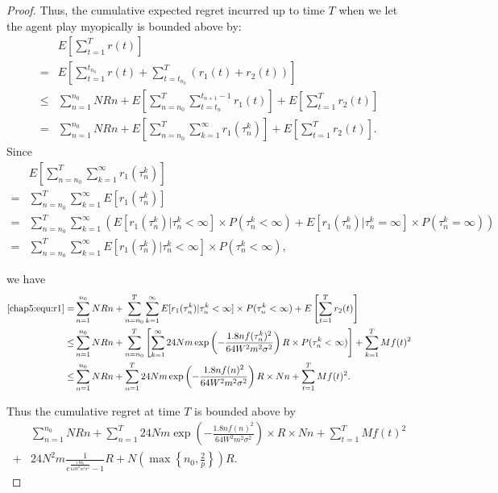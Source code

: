 \documentclass[twoside,11pt]{article}
\begin{document}
\begin{proof}
Thus, the cumulative expected regret incurred up to time $T$ when we let the agent play myopically is bounded above by:
\begin{align}
&E\left[\sum_{t=1}^{T}r(t)\right] \nonumber \\
=&E\left[\sum_{t=1}^{t_{n_{0}}} r(t) + \sum_{t=t_{n_{0}}}^{T}(r_1(t)+r_2(t))\right]  \nonumber \\
\leq & \sum_{n=1}^{n_{0}}NRn + E\left[\sum_{n=n_{0}}^{T}\sum_{t=t_{n}}^{t_{n+1}-1}r_1(t)\right]+ E\left[\sum_{t=1}^{T}r_2(t)\right] \nonumber \\
=& \sum_{n=1}^{n_{0}}NRn + E\left[\sum_{n=n_{0}}^{T}\sum_{k=1}^{\infty}r_1(\tau_{n}^{k})\right]+ E\left[\sum_{t=1}^{T}r_2(t)\right]. \label{chap5:equ:r1}
\end{align}
Since
\begin{align}
& E\left[\sum_{n=n_{0}}^{T}\sum_{k=1}^{\infty}r_1(\tau_{n}^{k})\right] \nonumber\\
= &  \sum_{n=n_{0}}^{T}\sum_{k=1}^{\infty}E[r_1(\tau_{n}^{k})] \nonumber \\
= &  \sum_{n=n_{0}}^{T}\sum_{k=1}^{\infty}(E[r_1(\tau_{n}^{k})|\tau_{n}^{k}<\infty]\times P(\tau_{n}^{k}<\infty)+E[r_1(\tau_{n}^{k})|\tau_{n}^{k}=\infty]\times P(\tau_{n}^{k}=\infty)) \nonumber \\
= & \sum_{n=n_{0}}^{T}\sum_{k=1}^{\infty}E[r_1(\tau_{n}^{k})|\tau_{n}^{k}<\infty]\times P(\tau_{n}^{k}<\infty), \nonumber
\end{align}

we have
\begin{align}
\eqref{chap5:equ:r1}= & \sum_{n=1}^{n_{0}}NRn + \sum_{n=n_{0}}^{T}\sum_{k=1}^{\infty}E[r_1(\tau_{n}^{k})|\tau_{n}^{k}<\infty]\times P(\tau_{n}^{k}<\infty) + E\left[\sum_{t=1}^{T}r_2(t)\right] \nonumber \\
\leq & \sum_{n=1}^{n_{0}}NRn + \sum_{n=n_{0}}^{T}\left[\sum_{k=1}^{\infty}24Nm\exp\left(-\frac{1.8n f(\tau_{n}^{k})^2}{64 W^2 m^2\sigma^2}\right) R\times P(\tau_{n}^{k}<\infty) \right]+ \sum_{k=1}^{T}Mf(t)^2 \nonumber \\
\leq & \sum_{n=1}^{n_{0}}NRn + \sum_{n=1}^{T} 24Nm\exp\left(-\frac{1.8n f(n)^2}{64 W^2 m^2\sigma^2}\right) R \times Nn+ \sum_{t=1}^{T}Mf(t)^2. \label{chap5:equ:regret}
\end{align}


 Thus the cumulative regret at time $T$ is bounded above by
\begin{align}
&\sum_{n=1}^{n_{0}}NRn + \sum_{n=1}^{T} 24Nm\exp\left(-\frac{1.8n f(n)^2}{64 W^2 m^2\sigma^2}\right)\times R \times Nn+ \sum_{t=1}^{T}Mf(t)^2 \nonumber \\
+ & 24N^2 m \frac{1}{e^{\frac{1.8\delta_{0}}{64W^2 m^2\sigma^2}}-1}R+N\left(\max\left\{n_{0},\frac{2}{p}\right\}\right)R. \nonumber
\end{align}


\end{proof}
\end{document}
